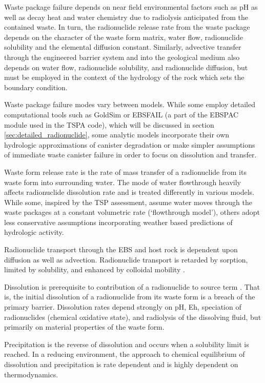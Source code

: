 

Waste package failure depends on near field environmental factors such as
pH as well as decay heat and water chemistry due to radiolysis anticipated from the
contained waste.  In turn, the radionuclide release rate from the waste package
depends on the character of the waste form matrix, water flow,
radionuclide solubility and the elemental diffusion constant.  Similarly, advective
transfer through the engineered barrier system and into the geological medium
also depends on water flow, radionuclide solubility, and radionuclide diffusion, but must
be employed in the context of the hydrology of the rock which sets the boundary    
condition.

Waste package failure modes vary between models. While some employ detailed 
computational tools such as GoldSim or EBSFAIL (a part of the EBSPAC module 
used in the TSPA code), which will be discussed in section 
\ref{sec:detailed_radionuclide}, some 
analytic models incorporate their own hydrologic approximations of
canister degradation or make simpler assumptions of immediate waste canister 
failure in order to focus on dissolution and transfer. 

Waste form release rate is the rate of mass transfer of a radionuclide from its
waste form into surrounding water. The mode of water flowthrough heavily
affects radionuclide dissolution rate and is treated differently in various models.
While some, inspired by the TSP assessment, assume water moves through the
waste packages at a constant volumetric rate (`flowthrough model'), others
adopt less conservative assumptions incorporating weather based predictions of
hydrologic activity.

Radionuclide transport through the \gls{EBS} and host rock is dependent upon 
diffusion as well as advection. Radionuclide transport is retarded by sorption,
limited by solubility, and enhanced by colloidal mobility 
\cite{bracke_safety_2008}. 

Dissolution is prerequisite to contribution of a radionuclide to source term 
\cite{bracke_safety_2008}. That is, the initial 
dissolution of a radionuclide from its waste form is a breach of the primary
barrier. Dissolution rates depend strongly on pH, Eh,
speciation of radionuclides (chemical oxidative state), and radiolysis of the
dissolving fluid, but primarily on material properties of the waste form.

Precipitation is the reverse of dissolution and occurs when a solubility limit
is reached. In a reducing environment, the approach to chemical equilibrium of 
dissolution and precipitation is rate dependent and is highly dependent on 
thermodynamics.

